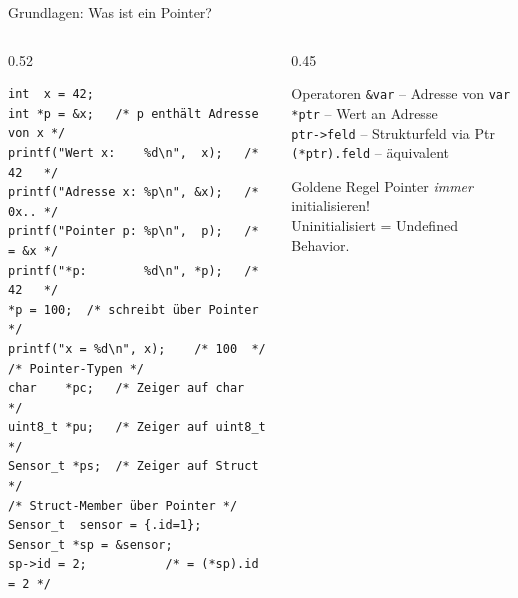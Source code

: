 \documentclass[%
  aspectratio=169,
  10pt
]{beamer}
\begin{document}
\begin{frame}[fragile]{Grundlagen: Was ist ein Pointer?}
  \begin{columns}[T]
    \begin{column}{0.52\textwidth}
\begin{lstlisting}
int  x = 42;
int *p = &x;   /* p enthält Adresse von x */
printf("Wert x:    %d\n",  x);   /* 42   */
printf("Adresse x: %p\n", &x);   /* 0x.. */
printf("Pointer p: %p\n",  p);   /* = &x */
printf("*p:        %d\n", *p);   /* 42   */
*p = 100;  /* schreibt über Pointer */
printf("x = %d\n", x);    /* 100  */
/* Pointer-Typen */
char    *pc;   /* Zeiger auf char    */
uint8_t *pu;   /* Zeiger auf uint8_t */
Sensor_t *ps;  /* Zeiger auf Struct  */
/* Struct-Member über Pointer */
Sensor_t  sensor = {.id=1};
Sensor_t *sp = &sensor;
sp->id = 2;           /* = (*sp).id = 2 */
\end{lstlisting}
    \end{column}
    \begin{column}{0.45\textwidth}

      \vspace{0.4em}
      \begin{block}{Operatoren}
        \texttt{\&var} -- Adresse von \texttt{var}\\
        \texttt{*ptr} -- Wert an Adresse\\
        \texttt{ptr->feld} -- Strukturfeld via Ptr\\
        \texttt{(*ptr).feld} -- äquivalent
      \end{block}
      \begin{alertblock}{Goldene Regel}
        Pointer \emph{immer} initialisieren! \\
        Uninitialisiert = Undefined Behavior.
      \end{alertblock}
    \end{column}
  \end{columns}
\end{frame}
\end{document}

